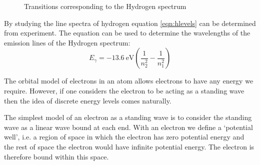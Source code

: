 \documentclass[main.tex]{subfiles}
\begin{document}
\begin{figure}
  \begin{center}
  \end{center}
  \caption{Transitions corresponding to the Hydrogen spectrum}
  \label{fig:hspec}
\end{figure}


By studying the line spectra of hydrogen equation \ref{eqn:hlevels} can be determined from experiment. The equation can be used to determine the wavelengths of the emission lines of the Hydrogen spectrum:
\[ E_\gamma = \SI{-13.6}{\electronvolt}\left(\frac{1}{n_2^2}-\frac{1}{n_1^2}\right) \]


The orbital model of electrons in an atom allows electrons to have any energy we require. However, if one considers the electron to be acting as a standing wave then the idea of discrete energy levels comes naturally.

The simplest model of an electron as a standing wave is to consider the standing wave as a linear wave bound at each end. With an electron we define a `potential well', i.e. a region of space in which the electron has zero potential energy and the rest of space the electron would have infinite potential energy. The electron is therefore bound within this space.
\end{document}
